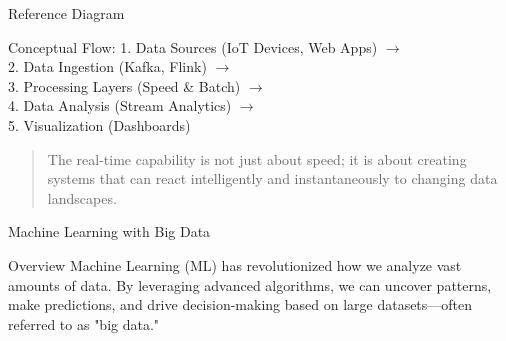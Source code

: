 \documentclass[aspectratio=169]{beamer}
\begin{document}
\begin{frame}[fragile]{Reference Diagram}
  \begin{block}{Conceptual Flow:}
    1. Data Sources (IoT Devices, Web Apps) $\rightarrow$ \\
    2. Data Ingestion (Kafka, Flink) $\rightarrow$ \\
    3. Processing Layers (Speed \& Batch) $\rightarrow$ \\
    4. Data Analysis (Stream Analytics) $\rightarrow$ \\
    5. Visualization (Dashboards)
  \end{block}
  \begin{quote}
    The real-time capability is not just about speed; it is about creating systems that can react intelligently and instantaneously to changing data landscapes.
  \end{quote}
\end{frame}

\begin{frame}{Machine Learning with Big Data}
    \begin{block}{Overview}
        Machine Learning (ML) has revolutionized how we analyze vast amounts of data. By leveraging advanced algorithms, we can uncover patterns, make predictions, and drive decision-making based on large datasets—often referred to as "big data."
    \end{block}
\end{frame}
\end{document}
